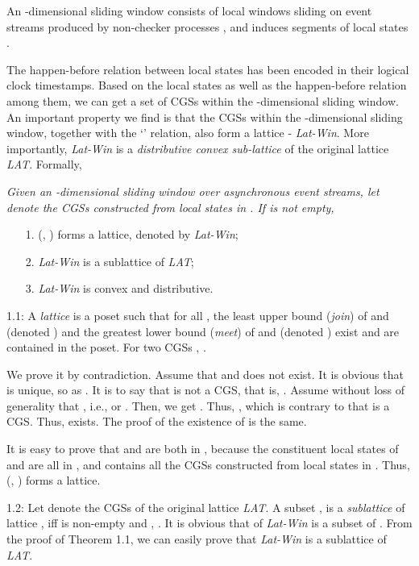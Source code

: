 \documentclass[12pt,journal,letterpaper,compsoc]{IEEEtran}
\begin{document}
An -dimensional sliding window consists of  local windows sliding on event streams produced by non-checker processes , and induces  segments of local states .

The happen-before relation between local states has been encoded in their logical clock timestamps. Based on the local states as well as the happen-before relation among them, we can get a set of CGSs within the -dimensional sliding window. An important property we find is that the CGSs within the -dimensional sliding window, together with the `' relation, also form a lattice - {\it Lat-Win}. More importantly, {\it Lat-Win} is a {\it distributive convex sub-lattice} of the original lattice {\it LAT}. Formally,\\

 {\it Given an -dimensional sliding window  over asynchronous event streams, let  denote the CGSs constructed from local states in . If  is not empty,
\begin{itemize}
    \item[1.] (, ) forms a lattice, denoted by {\it Lat-Win};
    \item[2.] {\it Lat-Win} is a sublattice of {\it LAT};
    \item[3.] {\it Lat-Win} is convex and distributive.
\end{itemize}}


1.1: A {\it lattice} is a poset  such that for all , the least upper bound ({\it join}) of  and  (denoted ) and the greatest lower bound ({\it meet}) of  and  (denoted ) exist and are contained in the poset. For two CGSs , .

We prove it by contradiction. Assume that  and  does not exist. It is obvious that  is unique, so as . It is to say that  is not a CGS, that is, . Assume without loss of generality that , i.e.,  or . Then, we get . Thus, , which is contrary to that  is a CGS. Thus,  exists. The proof of the existence of  is the same.

\iffalse
If    or  = , then   , which is contrary to that  is a CGS; If   , then , which is also contrary to that  is a CGS. Thus,  exists. The proof of the existence of  is the same.
\fi

It is easy to prove that  and  are both in , because the constituent local states of  and  are all in , and  contains all the CGSs constructed from local states in . Thus, (, ) forms a lattice.

1.2: Let  denote the CGSs of the original lattice {\it LAT}. A subset , is a {\it sublattice} of lattice , iff  is non-empty and , . It is obvious that  of {\it Lat-Win} is a subset of . From the proof of Theorem 1.1, we can easily prove that {\it Lat-Win} is a sublattice of {\it LAT}.
\end{document}
